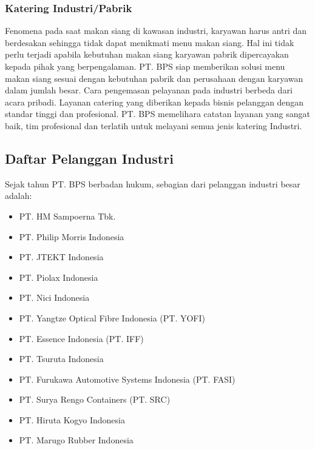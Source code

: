 \subsubsection{Katering Industri/Pabrik}
Fenomena pada saat makan siang di kawasan industri, karyawan harus antri dan berdesakan sehingga 
tidak dapat menikmati menu makan siang. Hal ini tidak perlu terjadi apabila kebutuhan makan siang 
karyawan pabrik dipercayakan kepada pihak yang berpengalaman. PT. BPS siap memberikan solusi menu makan 
siang sesuai dengan kebutuhan pabrik dan perusahaan dengan karyawan dalam jumlah besar. 
Cara pengemasan pelayanan pada industri berbeda dari acara pribadi.  
Layanan catering yang diberikan kepada bisnis pelanggan dengan standar tinggi dan profesional. 
PT. BPS memelihara catatan layanan yang sangat baik, 
tim profesional dan terlatih untuk melayani semua jenis katering Industri.

\subsection{Daftar Pelanggan Industri}

Sejak tahun PT. BPS berbadan hukum, sebagian dari pelanggan industri besar adalah:
\begin{multicols}{2}
\begin{itemize}
\item PT. HM Sampoerna Tbk.
\item PT. Philip Morris Indonesia
\item PT. JTEKT Indonesia
\item PT. Piolax Indonesia
\item PT. Nici Indonesia
\item PT. Yangtze Optical Fibre Indonesia (PT. YOFI)
\item PT. Essence Indonesia (PT. IFF)
\item PT. Tsuruta Indonesia
\item PT. Furukawa Automotive Systems Indonesia (PT. FASI)
\item PT. Surya Rengo Containers (PT. SRC)
\item PT. Hiruta Kogyo Indonesia
\item PT. Marugo Rubber Indonesia
\end{itemize}
\end{multicols}